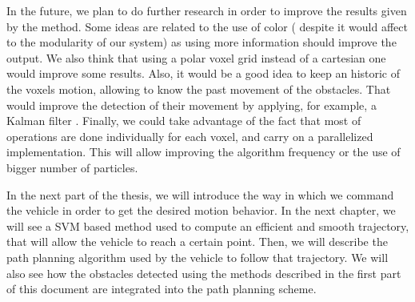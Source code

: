 In the future, we plan to do further research in order to improve the results given by the method. Some ideas are related to the use of color ( despite it would affect to the modularity of our system) as using more information should improve the output. We also think that using a polar voxel grid instead of a cartesian one would improve some results. Also, it would be a good idea to keep an historic of the voxels motion, allowing to know the past movement of the obstacles. That would improve the detection of their movement by applying, for example, a Kalman filter \citep{kalman1960new}. Finally, we could take advantage of the fact that most of operations are done individually for each voxel, and carry on a parallelized implementation. This will allow improving the algorithm frequency or the use of bigger number of particles.

In the next part of the thesis, we will introduce the way in which we command the vehicle in order to get the desired motion behavior. In the next chapter, we will see a \ac{SVM} based method used to compute an efficient and smooth trajectory, that will allow the vehicle to reach a certain point. Then, we will describe the path planning algorithm used by the vehicle to follow that trajectory. We will also see how the obstacles detected using the methods described in the first part of this document are integrated into the path planning scheme.
 
 
 
 